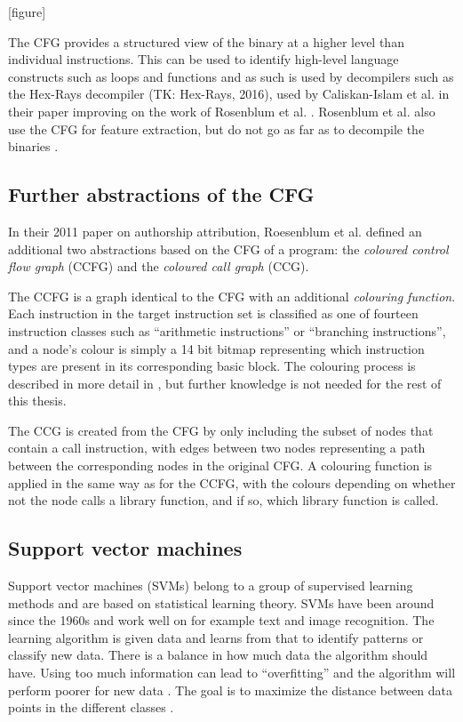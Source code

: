 \documentclass[a4paper,11pt]{kth-mag}
\begin{document}
[figure]

The CFG provides a structured view of the binary at a higher level than
individual instructions. This can be used to identify high-level language
constructs such as loops and functions \parencite{cifuentes1993methodology} and
as such is used by decompilers such as the Hex-Rays decompiler (TK: Hex-Rays,
2016), used by Caliskan-Islam et al. in their paper improving on the work of
Rosenblum et al. \parencite{caliskan2015coding}. Rosenblum et al. also use the
CFG for feature extraction, but do not go as far as to decompile the binaries
\parencite{rosenblum2011wrote}.

\subsection{Further abstractions of the CFG}
In their 2011 paper on authorship attribution, Roesenblum et al. defined an
additional two abstractions based on the CFG of a program: the \emph{coloured
control flow graph} (CCFG) and the \emph{coloured call graph} (CCG).

The CCFG is a graph identical to the CFG with an additional \emph{colouring
function}. Each instruction in the target instruction set is classified as one
of fourteen instruction classes such as ``arithmetic instructions'' or
``branching instructions'', and a node's colour is simply a 14 bit bitmap
representing which instruction types are present in its corresponding basic
block. The colouring process is described in more detail in
\parencite{rosenblum2011recovering}, but further knowledge is not needed for
the rest of this thesis.

The CCG is created from the CFG by only including the subset of nodes that contain
a call instruction, with edges between two nodes representing a path between
the corresponding nodes in the original CFG. A colouring function is applied in
the same way as for the CCFG, with the colours depending on whether not the
node calls a library function, and if so, which library function is called.

\subsection{Support vector machines}
Support vector machines (SVMs) belong to a group of supervised learning methods
and are based on statistical learning theory. SVMs have been around since the
1960s and work well on for example text and image recognition. The learning
algorithm is given data and learns from that to identify patterns or classify
new data. There is a balance in how much data the algorithm should have. Using
too much information can lead to ``overfitting'' and the algorithm will perform
poorer for new data \parencite{cristianini2000introduction}. The goal is to
maximize the distance between data points in the different classes
 \parencite{awad2004effective}. 
\end{document}
